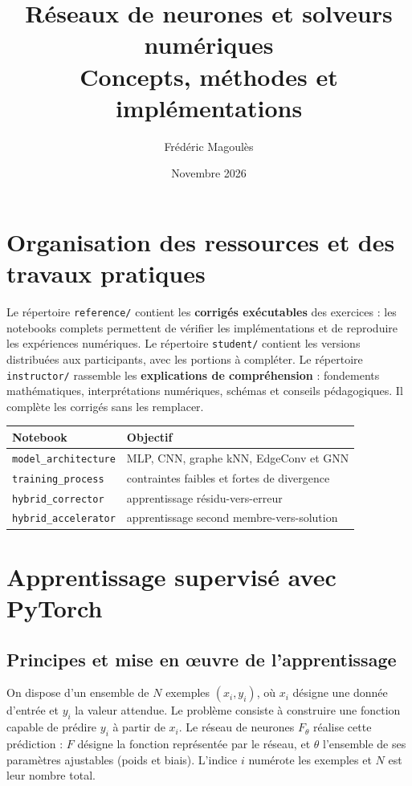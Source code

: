 \documentclass[11pt,a4paper]{article}
\title{Réseaux de neurones et solveurs numériques\\\large Concepts, méthodes et implémentations}
\author{Frédéric Magoulès}
\date{Novembre 2026}
\begin{document}
\maketitle\tableofcontents\newpage

\section{Organisation des ressources et des travaux pratiques}

Le répertoire \texttt{reference/} contient les \textbf{corrigés exécutables} des exercices : les notebooks complets permettent de vérifier les implémentations et de reproduire les expériences numériques.
Le répertoire \texttt{student/} contient les versions distribuées aux participants, avec les portions à compléter.
Le répertoire \texttt{instructor/} rassemble les \textbf{explications de compréhension} : fondements mathématiques, interprétations numériques, schémas et conseils pédagogiques. Il complète les corrigés sans les remplacer.
\begin{center}\begin{tabular}{ll}\toprule Notebook & Objectif \\\midrule
\texttt{model\_architecture} & MLP, CNN, graphe kNN, EdgeConv et GNN\\
\texttt{training\_process} & contraintes faibles et fortes de divergence\\
\texttt{hybrid\_corrector} & apprentissage résidu-vers-erreur\\
\texttt{hybrid\_accelerator} & apprentissage second membre-vers-solution\\\bottomrule\end{tabular}\end{center}

\section{Apprentissage supervisé avec PyTorch}

\subsection{Principes et mise en œuvre de l'apprentissage}

On dispose d'un ensemble de $N$ exemples $(x_i,y_i)$, où $x_i$ désigne une donnée d'entrée et $y_i$ la valeur attendue. Le problème consiste à construire une fonction capable de prédire $y_i$ à partir de $x_i$. Le réseau de neurones $F_\theta$ réalise cette prédiction : $F$ désigne la fonction représentée par le réseau, et $\theta$ l'ensemble de ses paramètres ajustables (poids et biais). L'indice $i$ numérote les exemples et $N$ est leur nombre total.
\end{document}

